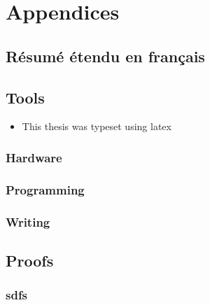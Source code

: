 \documentclass[../main.tex]{subfiles}
\begin{document}
\part{Appendices}
\chapter{Résumé étendu en français}

\chapter{Tools}
\minitoc
\begin{itemize}
  \item This thesis was typeset using \gls{latex}

\end{itemize}

\section{Hardware}
\section{Programming}
\section{Writing}
\section{}
\chapter{Proofs}
\minitoc
\section{sdfs}
\end{document}
